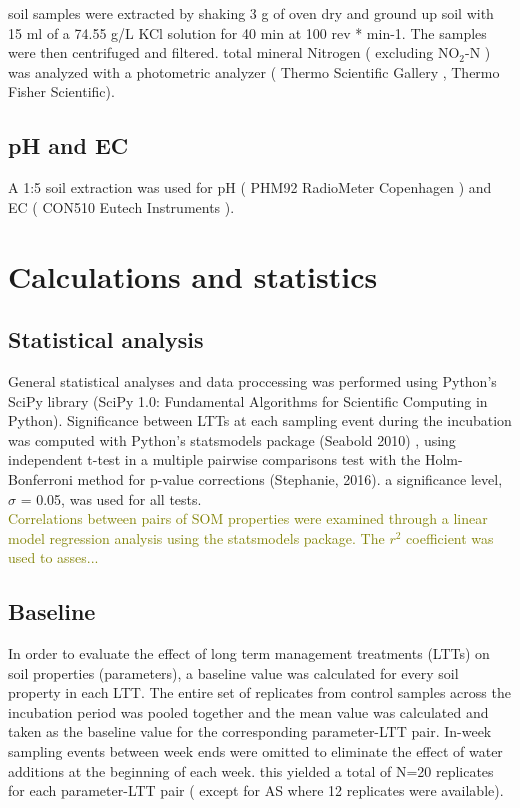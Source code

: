 \documentclass[12pt]{report}
\newcommand{\myGreen}[1]{\textcolor{olive}{#1}} %
\begin{document}
    	soil samples were extracted by shaking 3 g of oven dry and ground up soil with 15 ml of a 74.55 g/L KCl solution for 40 min at 100 rev * min-1. The samples were then centrifuged and filtered. total mineral Nitrogen ( excluding NO$_2$-N ) was analyzed with a photometric analyzer ( Thermo Scientific Gallery , Thermo Fisher Scientific). 
    
    \subsection{pH and EC}
    	
    	A 1:5 soil extraction was used for pH ( PHM92 RadioMeter Copenhagen ) and EC ( CON510 Eutech Instruments ).
    	

\section{Calculations and statistics}
    
    \subsection{Statistical analysis}
    	
    	General statistical analyses and data proccessing was performed using Python’s SciPy library (SciPy 1.0: Fundamental Algorithms for Scientific Computing in Python). Significance between LTTs at each sampling event during the incubation was computed with Python’s statsmodels package (Seabold 2010) , using independent t-test in a multiple pairwise comparisons test with the Holm-Bonferroni method for p-value corrections (Stephanie, 2016). a significance level, $\sigma$  = 0.05, was used for all tests. \\
    	\myGreen{Correlations between pairs of SOM properties were examined through a linear model regression analysis using the statsmodels package. The  $ r^2 $ coefficient was used to asses...} \\
    	
    \subsection{Baseline}
    	
    	In order to evaluate the effect of long term management treatments (LTTs) on soil properties (parameters), a baseline value was calculated for every soil property in each LTT. The entire set of replicates from control samples across the incubation period was pooled together and the mean value was calculated and taken as the baseline value for the corresponding parameter-LTT pair. In-week sampling events between week ends were omitted to eliminate the effect of water additions at the beginning of each week. this yielded a total of N=20 replicates for each parameter-LTT pair ( except for AS where 12 replicates were available). 
    	
\end{document}
